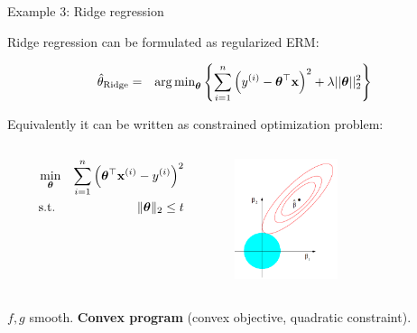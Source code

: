 \documentclass[11pt,compress,t,notes=noshow, xcolor=table]{beamer}
\begin{document}
\begin{vbframe}{Example 3: Ridge regression}
		
Ridge regression can be formulated as regularized ERM: 

\begin{eqnarray*}  
	\hat{\theta}_{\text{Ridge}} &=& \operatorname{arg\,min}_{\bm{\theta}} \left\{ \sum\limits_{i=1}^n \left(y^{(i)} - \bm{\theta}^\top\mathbf{x}\right)^2 + \lambda ||\bm{\theta}||_2^2 \right\}
\end{eqnarray*}

Equivalently it can be written as constrained optimization problem: 

\vspace*{-0.2cm}
\begin{columns}[T] %
	\begin{column}{.48\textwidth}
		\begin{eqnarray*}
			\min_{\bm{\theta}} && \sum_{i = 1}^n \left(\bm{\theta}^\top \mathbf{x}^{(i)} - y^{(i)}\right)^2 \\
			\text{s.t. } && \|\bm{\theta}\|_2 \le t
		\end{eqnarray*}
		
	\end{column}

	\begin{column}{.48\textwidth}
		\begin{center}
			\includegraphics[width=0.45\textwidth, keepaspectratio]{figure_man/ridge.png} 
		\end{center}
	\end{column}
\end{columns}

\vspace*{0.2cm}

$f, g$ smooth. \textbf{Convex program} (convex objective, quadratic constraint). 

\end{vbframe}
	
\end{document}
